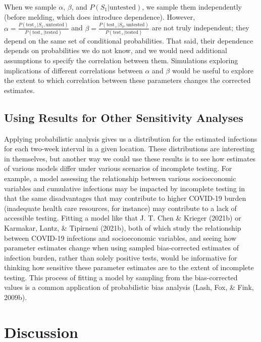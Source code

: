 \documentclass[12pt,twoside]{smiththesis}
\begin{document}
When we sample \(\alpha\), \(\beta\), and \(P(S_1|\text{untested})\), we sample them independently (before melding, which does introduce dependence). However, \(\alpha=\frac{P(\text{test}_+|S_1, \text{untested})}{P(\text{test}_+| \text{tested})}\) and \(\beta=\frac{P(\text{test}_+|S_0, \text{untested})}{P(\text{test}_+| \text{tested})}\) are not truly independent; they depend on the same set of conditional probabilities. That said, their dependence depends on probabilities we do not know, and we would need additional assumptions to specify the correlation between them. Simulations exploring implications of different correlations between \(\alpha\) and \(\beta\) would be useful to explore the extent to which correlation between these parameters changes the corrected estimates.

\hypertarget{using-results-for-other-sensitivity-analyses}{%
\subsection{Using Results for Other Sensitivity Analyses}\label{using-results-for-other-sensitivity-analyses}}

Applying probabilistic analysis gives us a distribution for the estimated infections for each two-week interval in a given location. These distributions are interesting in themselves, but another way we could use these results is to see how estimates of various models differ under various scenarios of incomplete testing. For example, a model assessing the relationship between various socioeconomic variables and cumulative infections may be impacted by incomplete testing in that the same disadvantages that may contribute to higher COVID-19 burden (inadequate health care resources, for instance) may contribute to a lack of accessible testing. Fitting a model like that J. T. Chen \& Krieger (2021b) or Karmakar, Lantz, \& Tipirneni (2021b), both of which study the relationship between COVID-19 infections and socioeconomic variables, and seeing how parameter estimates change when using sampled bias-corrected estimates of infection burden, rather than solely positive tests, would be informative for thinking how sensitive these parameter estimates are to the extent of incomplete testing. This process of fitting a model by sampling from the bias-corrected values is a common application of probabilistic bias analysis (Lash, Fox, \& Fink, 2009b).

\hypertarget{discussion}{%
\section{Discussion}\label{discussion}}
\end{document}
